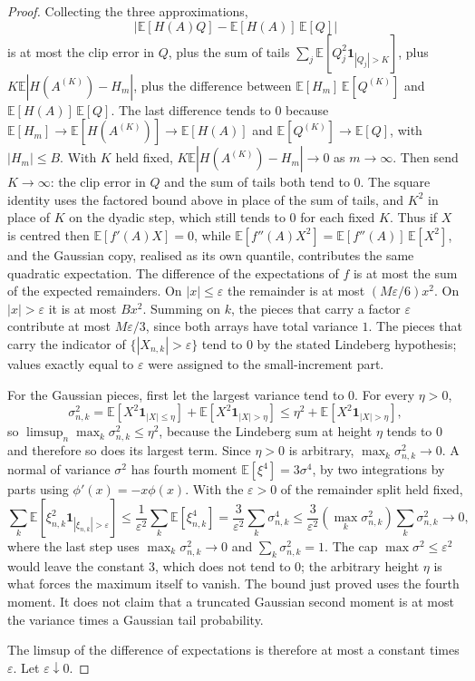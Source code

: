 \begin{proof}
Collecting the three approximations,
\[
 \bigl|\mathbb E[H(A)Q]-\mathbb E[H(A)]\,\mathbb E[Q]\bigr|
\]
is at most the clip error in $Q$, plus the sum of tails $\sum_j\mathbb E[Q_j^2\mathbf 1_{|Q_j|>K}]$, plus $K\mathbb E|H(A^{(K)})-H_m|$, plus the difference between $\mathbb E[H_m]\,\mathbb E[Q^{(K)}]$ and $\mathbb E[H(A)]\,\mathbb E[Q]$. The last difference tends to $0$ because $\mathbb E[H_m]\to\mathbb E[H(A^{(K)})]\to\mathbb E[H(A)]$ and $\mathbb E[Q^{(K)}]\to\mathbb E[Q]$, with $|H_m|\le B$. With $K$ held fixed, $K\mathbb E|H(A^{(K)})-H_m|\to0$ as $m\to\infty$. Then send $K\to\infty$: the clip error in $Q$ and the sum of tails both tend to $0$. The square identity uses the factored bound above in place of the sum of tails, and $K^2$ in place of $K$ on the dyadic step, which still tends to $0$ for each fixed $K$. Thus if $X$ is centred then $\mathbb E[f'(A)X]=0$, while $\mathbb E[f''(A)X^2]=\mathbb E[f''(A)]\,\mathbb E[X^2]$, and the Gaussian copy, realised as its own quantile, contributes the same quadratic expectation. The difference of the expectations of $f$ is at most the sum of the expected remainders. On $|x|\le\varepsilon$ the remainder is at most $(M\varepsilon/6)x^2$. On $|x|>\varepsilon$ it is at most $B x^2$. Summing on $k$, the pieces that carry a factor $\varepsilon$ contribute at most $M\varepsilon/3$, since both arrays have total variance $1$. The pieces that carry the indicator of $\{|X_{n,k}|>\varepsilon\}$ tend to $0$ by the stated Lindeberg hypothesis; values exactly equal to $\varepsilon$ were assigned to the small-increment part.

For the Gaussian pieces, first let the largest variance tend to $0$. For every $\eta>0$,
\[
\sigma_{n,k}^2=\mathbb E[X^2\mathbf 1_{|X|\le\eta}]+\mathbb E[X^2\mathbf 1_{|X|>\eta}]\le\eta^2+\mathbb E[X^2\mathbf 1_{|X|>\eta}],
\]
so $\limsup_n\max_k\sigma_{n,k}^2\le\eta^2$, because the Lindeberg sum at height $\eta$ tends to $0$ and therefore so does its largest term. Since $\eta>0$ is arbitrary, $\max_k\sigma_{n,k}^2\to0$. A normal of variance $\sigma^2$ has fourth moment $\mathbb E[\xi^4]=3\sigma^4$, by two integrations by parts using $\phi'(x)=-x\phi(x)$. With the $\varepsilon>0$ of the remainder split held fixed,
\[
\sum_k\mathbb E[\xi_{n,k}^2\mathbf 1_{|\xi_{n,k}|>\varepsilon}]
\le\frac1{\varepsilon^2}\sum_k\mathbb E[\xi_{n,k}^4]
=\frac3{\varepsilon^2}\sum_k\sigma_{n,k}^4
\le\frac3{\varepsilon^2}(\max_k\sigma_{n,k}^2)\sum_k\sigma_{n,k}^2\to0,
\]
where the last step uses $\max_k\sigma_{n,k}^2\to0$ and $\sum_k\sigma_{n,k}^2=1$. The cap $\max\sigma^2\le\varepsilon^2$ would leave the constant $3$, which does not tend to $0$; the arbitrary height $\eta$ is what forces the maximum itself to vanish.
The bound just proved uses the fourth moment. It does not claim that a truncated Gaussian second moment is at most the variance times a Gaussian tail probability.

The limsup of the difference of expectations is therefore at most a constant times $\varepsilon$. Let $\varepsilon\downarrow0$.
\end{proof}

